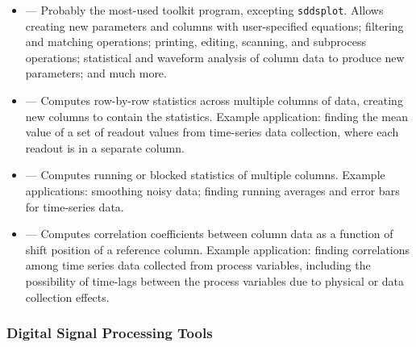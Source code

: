 \documentclass[11pt]{article}
\begin{document}
\begin{itemize}
\item {} --- Probably the most-used toolkit program, excepting \verb|sddsplot|.  Allows
creating new parameters and columns with user-specified equations; filtering and matching operations; printing,
editing, scanning, and subprocess operations; statistical and waveform analysis of column data to produce new
parameters; and much more.

\item {} --- Computes row-by-row statistics across multiple columns of data, creating
new columns to contain the statistics.  Example application: finding the mean value of a set of readout
values from time-series data collection, where each readout is in a separate column.

\item {} --- Computes running or blocked statistics of multiple columns.  Example
applications: smoothing noisy data; finding running averages and error bars for time-series data.

\item {} --- Computes correlation coefficients
between column data as a function of shift position of a reference
column.  Example application: finding correlations among time series
data collected from process variables, including the possibility of
time-lags between the process variables due to physical or data
collection effects.

\end{itemize}

\subsubsection{Digital Signal Processing Tools}
\end{document}
